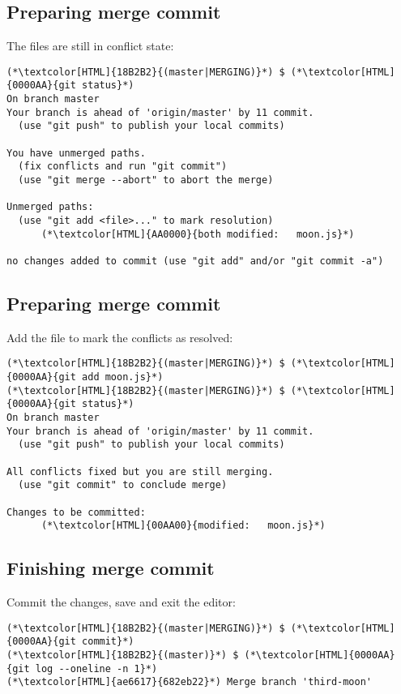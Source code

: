 \subsection{Preparing merge commit}
\begin{frame}[fragile]
  \subslidetitle

  The files are still in conflict state:
  \begin{lstlisting}
(*\textcolor[HTML]{18B2B2}{(master|MERGING)}*) $ (*\textcolor[HTML]{0000AA}{git status}*)
On branch master
Your branch is ahead of 'origin/master' by 11 commit.
  (use "git push" to publish your local commits)

You have unmerged paths.
  (fix conflicts and run "git commit")
  (use "git merge --abort" to abort the merge)

Unmerged paths:
  (use "git add <file>..." to mark resolution)
      (*\textcolor[HTML]{AA0000}{both modified:   moon.js}*)

no changes added to commit (use "git add" and/or "git commit -a")
\end{lstlisting}
\end{frame}

\subsection{Preparing merge commit}
\begin{frame}[fragile]
  \subslidetitle

  Add the file to mark the conflicts as resolved:
  \begin{lstlisting}
(*\textcolor[HTML]{18B2B2}{(master|MERGING)}*) $ (*\textcolor[HTML]{0000AA}{git add moon.js}*)
(*\textcolor[HTML]{18B2B2}{(master|MERGING)}*) $ (*\textcolor[HTML]{0000AA}{git status}*)
On branch master
Your branch is ahead of 'origin/master' by 11 commit.
  (use "git push" to publish your local commits)

All conflicts fixed but you are still merging.
  (use "git commit" to conclude merge)

Changes to be committed:
      (*\textcolor[HTML]{00AA00}{modified:   moon.js}*)
\end{lstlisting}
\end{frame}

\subsection{Finishing merge commit}
\begin{frame}[fragile]
  \subslidetitle

  Commit the changes, save and exit the editor:
  \begin{lstlisting}
(*\textcolor[HTML]{18B2B2}{(master|MERGING)}*) $ (*\textcolor[HTML]{0000AA}{git commit}*)
(*\textcolor[HTML]{18B2B2}{(master)}*) $ (*\textcolor[HTML]{0000AA}{git log --oneline -n 1}*)
(*\textcolor[HTML]{ae6617}{682eb22}*) Merge branch 'third-moon'
\end{lstlisting}
\end{frame}

